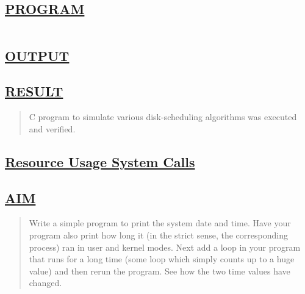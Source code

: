 \documentclass[a4paper, 12pt]{article}
\begin{document}
\subsection*{\underline{PROGRAM}}
\begin{quote}
\inputminted[fontsize=\small,breaklines,breakanywhere]{c}{disk_scheduling.c}
\end{quote}

\newpage
\subsection*{\underline{OUTPUT}}

\begin{figure}[H] 
    \centering
\end{figure}


\subsection*{\underline{RESULT}}
\begin{quote}
C program to simulate various disk-scheduling algorithms was executed and verified.
\end{quote}

\newpage
\begin{center}
\section*{\LARGE \textbf{\underline{Resource Usage System Calls}}} 
\end{center}

\subsection*{\underline{AIM}}
\begin{quote}
Write a simple program to print the system date and time. Have your program also print how long it (in the strict sense, the corresponding process) ran in user and kernel modes. Next add a loop in your program that runs for a long time (some loop which simply counts up to a huge value) and then rerun the program. See how the two time values have changed.
\end{quote}
\end{document}
